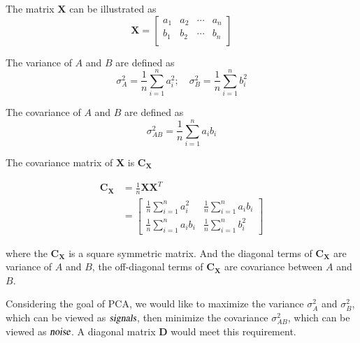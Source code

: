 \documentclass{aa}
\begin{document}
\begin{CJK*}{UTF8}{gbsn}
   
   The matrix $\textbf{X}$ can be illustrated as
   \begin{equation}
       \textbf{X} = \left[
                \begin{matrix}
                     a_{1}      & a_{2}      & \cdots & a_{n}      \\
                     b_{1}      & b_{2}      & \cdots & b_{n}      \\
                \end{matrix}
            \right]
   \end{equation}
   
   
   The variance of $A$ and $B$ are defined as
   \begin{equation}
       \sigma_{A}^{2} = \frac{1}{n}\sum_{i=1}^{n}a_{i}^{2}; \quad  \sigma_{B}^{2} = \frac{1}{n}\sum_{i=1}^{n}b_{i}^{2}
   \end{equation} 
   
   
  The covariance of $A$ and $B$ are defined as
  \begin{equation}
      \sigma_{AB}^{2} = \frac{1}{n}\sum_{i=1}^{n}a_{i}b_{i}
  \end{equation}
  
  The covariance matrix of $\textbf{X}$ is $\textbf{C}_{\textbf{X}}$
  
  \begin{equation}
      \begin{aligned}
\textbf{C}_{\textbf{X}} &= \frac{1}{n}\textbf{X}\textbf{X}^{T}\\
                        &= \left[
                            \begin{matrix}
                              \frac{1}{n}\sum_{i=1}^{n}a_{i}^{2}  & \frac{1}{n}\sum_{i=1}^{n}a_{i}b_{i} \\
                              \frac{1}{n}\sum_{i=1}^{n}a_{i}b_{i} & \frac{1}{n}\sum_{i=1}^{n}b_{i}^{2}
                            \end{matrix}
   \right]
\end{aligned}
  \end{equation}
  
  
  where the $\textbf{C}_{\textbf{X}}$ is a square symmetric matrix. And the diagonal terms of $\textbf{C}_{\textbf{X}}$ are variance of $A$ and $B$, the off-diagonal terms of $\textbf{C}_{\textbf{X}}$ are covariance between $A$ and $B$. 
  
  Considering the goal of PCA, we would like to maximize the variance $\sigma_{A}^{2}$ and $\sigma_{B}^{2}$, which can be viewed as $\textsl{signals}$, then minimize the covariance $\sigma_{AB}^{2}$, which can be viewed as $\textsl{noise}$. A diagonal matrix $\textbf{D}$ would meet this requirement. 
  

\end{CJK*}
\end{document}
